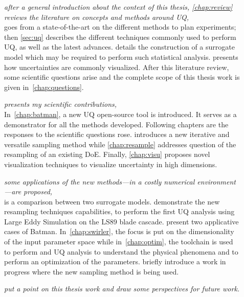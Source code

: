 \begin{description}
	\item[] \emph{after a general introduction about the context of this thesis,  \cref{chap:review} reviews the literature on concepts and methods around UQ,}\hfill\\
 goes from a state-of-the-art on the different methods to plan experiments; then \cref{sec:uq} describes the different techniques commonly used to perform UQ, as well as the latest advances.  details the construction of a surrogate model which may be required to perform such statistical analysis.  presents how uncertainties are commonly visualized. After this literature review, some scientific questions arise and the complete scope of this thesis work is given in~\cref{chap:questions}.

	\item[] \emph{presents my scientific contributions,}\hfill\\
In~\cref{chap:batman}, a new UQ open-source tool is introduced. It serves as a demonstrator for all the methods developed. Following chapters are the responses to the scientific questions rose.  introduces a new iterative and versatile sampling method while \cref{chap:resample} addresses question of the resampling of an existing DoE. Finally, \cref{chap:visu} proposes novel visualization techniques to visualize uncertainty in high dimensions.

	\item[] \emph{some applications of the new methods---in a costly numerical environment---are proposed,}\hfill\\
 is a comparison between two surrogate models.  demonstrate the new resampling techniques capabilities, to perform the first UQ analysis using Large Eddy Simulation on the LS89 blade cascade.  present two applicative cases of Batman. In~\cref{chap:swirler}, the focus is put on the dimensionality of the input parameter space while in~\cref{chap:optim}, the toolchain is used to perform and UQ analysis to understand the physical phenomena and to perform an optimization of the parameters.  briefly introduce a work in progress where the new sampling method is being used.

	\item[] \emph{put a point on this thesis work and draw some perspectives for future work.}
\end{description}


